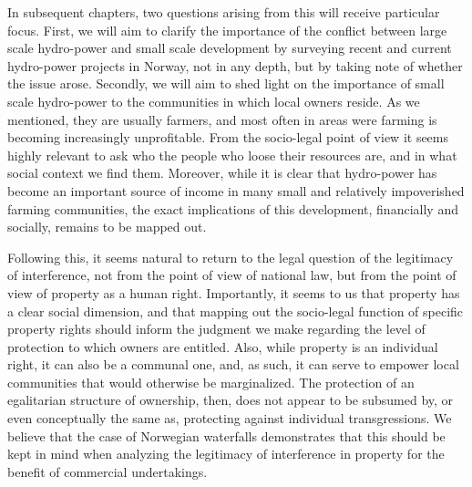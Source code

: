 In subsequent chapters, two questions arising from this will receive particular focus. First, we will aim to clarify the importance of the conflict between large scale hydro-power and small scale development by surveying recent and current hydro-power projects in Norway, not in any depth, but by taking note of whether the issue arose. Secondly, we will aim to shed light on the importance of small scale hydro-power to the communities in which local owners reside. As we mentioned, they are usually farmers, and most often in areas were farming is becoming increasingly unprofitable. From the socio-legal point of view it seems highly relevant to ask who the people who loose their resources are, and in what social context we find them. Moreover, while it is clear that hydro-power has become an important source of income in many small and relatively impoverished farming communities, the exact implications of this development, financially and socially, remains to be mapped out.

Following this, it seems natural to return to the legal question of the legitimacy of interference, not from the point of view of national law, but from the point of view of property as a human right. Importantly, it seems to us that property has a clear social dimension, and that mapping out the socio-legal function of specific property rights should inform the judgment we make regarding the level of protection to which owners are entitled. Also, while property is an individual right, it can also be a communal one, and, as such, it can serve to empower local communities that would otherwise be marginalized. The protection of an egalitarian structure of ownership, then, does not appear to be subsumed by, or even conceptually the same as, protecting against individual transgressions. We believe that the case of Norwegian waterfalls demonstrates that this should be kept in mind when analyzing the legitimacy of interference in property for the benefit of commercial undertakings.


